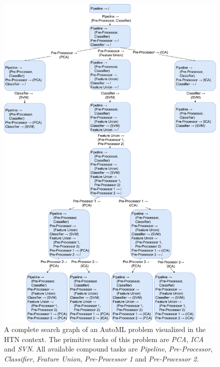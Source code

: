 \begin{figure}[ht!]
    \centering
    \includegraphics[width=\textwidth]{gfx/Figures/Approach/HTNAutoML.pdf}
    \caption[A complete search graph of an AutoML problem visualized in the HTN context.]{A complete search graph of an AutoML problem visualized in the HTN context. The primitive tasks of this problem are \textit{PCA}, \textit{ICA} and \textit{SVN}.
    All available compound tasks are \textit{Pipeline}, \textit{Pre-Processor}, \textit{Classifier}, \textit{Feature Union}, \textit{Pre-Processor 1} and \textit{Pre-Processor 2}.}
    \label{fig:approach:htn-automl}
\end{figure}

